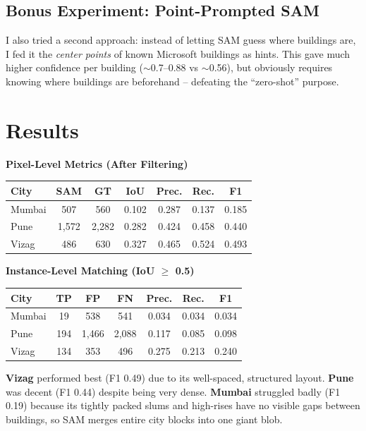 \documentclass[9pt, a4paper]{article}
\begin{document}
\subsection*{Bonus Experiment: Point-Prompted SAM}
I also tried a second approach: instead of letting SAM guess where buildings are, I fed it the \textit{center points} of known Microsoft buildings as hints. This gave much higher confidence per building ($\sim$0.7--0.88 vs $\sim$0.56), but obviously requires knowing where buildings are beforehand -- defeating the ``zero-shot'' purpose.

\section*{Results}

\vspace{2pt}
\begin{minipage}[t]{0.48\textwidth}
\centering
{\small\textbf{Pixel-Level Metrics (After Filtering)}}\\[3pt]
\footnotesize
\begin{tabular}{@{}lcccccc@{}}
\toprule
\textbf{City} & \textbf{SAM} & \textbf{GT} & \textbf{IoU} & \textbf{Prec.} & \textbf{Rec.} & \textbf{F1} \\
\midrule
Mumbai & 507 & 560 & 0.102 & 0.287 & 0.137 & 0.185 \\
Pune & 1,572 & 2,282 & 0.282 & 0.424 & 0.458 & 0.440 \\
Vizag & 486 & 630 & 0.327 & 0.465 & 0.524 & 0.493 \\
\bottomrule
\end{tabular}
\end{minipage}
\hfill
\begin{minipage}[t]{0.48\textwidth}
\centering
{\small\textbf{Instance-Level Matching (IoU $\geq$ 0.5)}}\\[3pt]
\footnotesize
\begin{tabular}{@{}lcccccc@{}}
\toprule
\textbf{City} & \textbf{TP} & \textbf{FP} & \textbf{FN} & \textbf{Prec.} & \textbf{Rec.} & \textbf{F1} \\
\midrule
Mumbai & 19 & 538 & 541 & 0.034 & 0.034 & 0.034 \\
Pune & 194 & 1,466 & 2,088 & 0.117 & 0.085 & 0.098 \\
Vizag & 134 & 353 & 496 & 0.275 & 0.213 & 0.240 \\
\bottomrule
\end{tabular}
\end{minipage}

\vspace{4pt}
\textbf{Vizag} performed best (F1 0.49) due to its well-spaced, structured layout. \textbf{Pune} was decent (F1 0.44) despite being very dense. \textbf{Mumbai} struggled badly (F1 0.19) because its tightly packed slums and high-rises have no visible gaps between buildings, so SAM merges entire city blocks into one giant blob.
\end{document}
